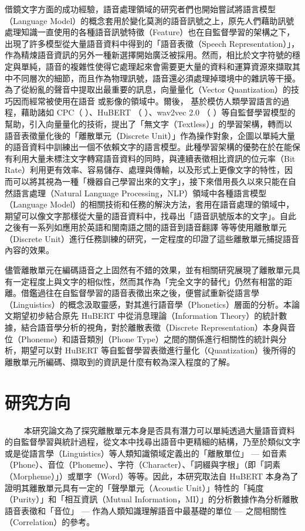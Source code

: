 借鏡文字方面的成功經驗，語音處理領域的研究者們也開始嘗試將語言模型（Language Model）的概念套用於變化莫測的語音訊號之上，原先人們藉助訊號處理知識一直使用的各種語音訊號特徵（Feature）也在自監督學習的架構之下，出現了許多模型從大量語音資料中得到的「語音表徵（Speech Representation）」，作為精煉語音資訊的另外一種新選擇開始廣泛被採用。然而，相比於文字符號的穩定與單純，語音的複雜性使得它處理起來會需要更大量的資料和運算資源來擷取其中不同層次的細節，而且作為物理訊號，語音還必須處理掉環境中的雜訊等干擾。為了從紛亂的聲音中提取出最重要的訊息，向量量化（Vector Quantization）的技巧因而經常被使用在語音 \cite{chorowski_unsupervised_2019,chen_vector_2023,zhao_speech_2023} 或影像的領域中。爾後， \cite{lakhotia_generative_2021-1}  基於模仿人類學習語言的過程，藉助諸如 CPC（\cite{oord_representation_2019} ）、HuBERT （\cite{hsu_hubert_2021} ）、wav2vec 2.0 （\cite{baevski_wav2vec_2020} ）等自監督學習模型的幫助，引入向量量化的技術，提出了「無文字（Textless）」的學習架構，轉而以語音表徵量化後的「離散單元（Discrete Unit）」作為操作對象，企圖以單純大量的語音資料中訓練出一個不依賴文字的語言模型。此種學習架構的優勢在於在能保有利用大量未標注文字轉寫語音資料的同時，與連續表徵相比資訊的位元率（Bit Rate）利用更有效率、容易儲存、處理與傳輸，以及形式上更像文字的特性，因而可以將其視為一種「機器自己學習出來的文字」，接下來借用長久以來只能在自然語言處理（Natural Language Processing，NLP）領域中各種語言模型（Language Model）的相關技術和任務的解決方法，套用在語音處理的領域中，期望可以像文字那樣從大量的語音資料中，找尋出「語音訊號版本的文字」。自此之後有一系列如應用於英語和閩南語之間的語音到語音翻譯 \cite{chen_speech--speech_2023} 等等使用離散單元（Discrete Unit）進行任務訓練的研究，一定程度的印證了這些離散單元捕捉語音內容的效果。

儘管離散單元在編碼語音之上固然有不錯的效果，並有相關研究展現了離散單元具有一定程度上與文字的相似性，然而其作為「完全文字的替代」仍然有相當的距離。借鑑過往在自監督學習的語音表徵出來之後，便嘗試重新從語言學（Linguistics）的概念汲取靈感，對其進行語音學（Phonetics）層面的分析。本論文期望初步結合原先 HuBERT 中從消息理論（Information Theory）的統計數據，結合語音學分析的視角，對於離散表徵（Discrete Representation）本身與音位（Phoneme）和語音類別（Phone Type）之間的關係進行相關性的統計與分析，期望可以對 HuBERT 等自監督學習表徵進行量化（Quantization）後所得的離散單元所編碼、擷取到的資訊是什麼有較為深入程度的了解。

    
\section{研究方向}
　　
本研究論文為了探究離散單元本身是否具有潛力可以單純透過大量語音資料的自監督學習與統計過程，從文本中找尋出語音中更精細的結構，乃至於類似文字或是從語言學（Linguistics）等人類知識領域定義出的「離散單位」 --- 如音素（Phone）、音位（Phoneme）、字符（Character）、「詞綴與字根」（即「詞素（Morpheme）」）或單字（Word）等等。因此，本研究取法自 HuBERT 本身為了證明其離散單元具有一定的「聲學單元（Acoustic Unit）」特性的「純度（Purity）」和「相互資訊（Mutual Information，MI）」的分析數據作為分析離散語音表徵和「音位」 --- 作為人類知識理解語音中最基礎的單位 --- 之間相關性（Correlation）的參考。

